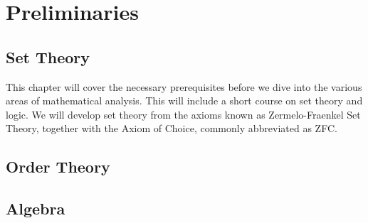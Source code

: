 \part{Preliminaries}
    \chapter{Set Theory}
        This chapter will cover the necessary prerequisites before we dive into
        the various areas of mathematical analysis. This will include a short
        course on set theory and logic. We will develop set theory from the
        axioms known as Zermelo-Fraenkel Set Theory, together with the Axiom of
        Choice, commonly abbreviated as ZFC.
        
        
        
        
    \chapter{Order Theory}
        
    \chapter{Algebra}
        
